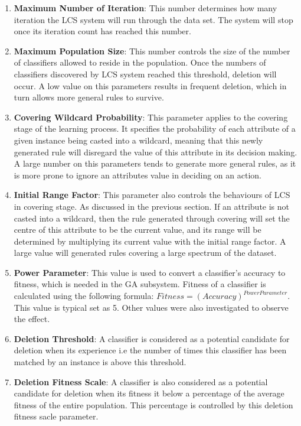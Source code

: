 \documentclass[11pt]{article}
\begin{document}
\begin{enumerate}
	\itemsep0em
	\item \textbf{Maximum Number of Iteration}: This number determines how many iteration the LCS system will run through the data set. The system will stop once its iteration count has reached this number.
	\item \textbf{Maximum Population Size}: This number controls the size of the number of classifiers allowed to reside in the    population. Once the numbers of classifiers discovered by LCS system reached this threshold, deletion will occur. A low value on this parameters results in frequent deletion, which in turn allows more general rules to survive.
	\item \textbf{Covering Wildcard Probability}: This parameter applies to the covering stage of the learning process. It specifies the probability of each attribute of a given instance being casted into a wildcard, meaning that this newly generated rule will disregard the value of this attribute in its decision making. A large number on this parameters tends to generate more general rules, as it is more prone to ignore an attributes value in deciding on an action.
	\item \textbf{Initial Range Factor}: This parameter also controls the behaviours of LCS in covering stage. As discussed in the previous section. If an attribute is not casted into a wildcard, then the rule generated through covering will set the centre of this attribute to be the current value, and its range will be determined by multiplying its current value with the initial range factor. A large value will generated rules covering a large spectrum of the dataset.
	\item \textbf{Power Parameter}:	This value is used to convert a classifier's accuracy to fitness, which is needed in the GA subsystem. Fitness of a classifier is calculated using the following formula:	$Fitness = (Accuracy)^{Power Parameter}$. This value is typical set as 5. Other values were also investigated to observe the effect.
	\item \textbf{Deletion Threshold}: A classifier is considered as a potential candidate for deletion when its experience i.e the number of times this classifier has been matched by an instance is above this threshold.
	\item \textbf{Deletion Fitness Scale}: A classifier is also considered as a potential candidate for deletion when its fitness it below a percentage of the average fitness of the entire population. This percentage is controlled by this deletion fitness sacle parameter.

\end{enumerate}
\end{document}
